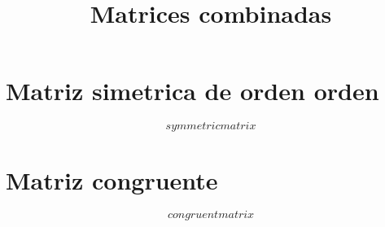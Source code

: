 \documentclass[12pt]{article}
\begin{document}
\title{Matrices combinadas}
\maketitle

\section*{Matriz simetrica de orden {{orden}}}

$${{symmetricmatrix}}$$


\section*{Matriz congruente}

$${{congruentmatrix}}$$
\end{document}
